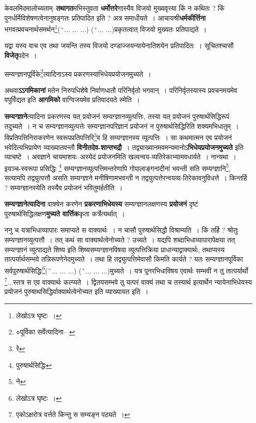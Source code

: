 \documentclass[article,12pt,a4paper]{memoir}
\newcommand{\add}[1]{($^{+}$#1)}
\begin{document}
	  \pstart केवलमिदमालोच्यताम्--\textbf{तथागत}मभिस्तुवता \textbf{धर्मोत्तरे}णास्यैव विजयो मुख्यवृत्त्या किं न कथितः ? किं पुनर्धर्मिविशेषणत्वेनानुषङ्गतः प्रतिपादित इति ? अत्र समाधीयते । आचायश्री\textbf{धर्मकीर्त्तिना} भगवत्प्रवचनार्थसमर्थन\footnote{लेखोऽत्र घृष्टः ।}\add{... ... ...} \add{... ...}प्रकृतत्वात् विजयो मुख्यतः प्रतिपाद्यते ।
	\pend
      

	  \pstart यद्वा यस्य वाच एव तथा जयन्ति तस्य विजयो दण्डाज्जयन्यायेनातिशयेन प्रतिपादितः । सूचितश्चासौ \textbf{विजेतृ}पदेन ।
	\pend
	  \bigskip
	  \begingroup
	

	  \pstart सम्यग्ज्ञानपूर्विके\footnote{०पूर्विका सर्वेत्यादिना--\cite{dp-msA} \cite{dp-edP} \cite{dp-edE}}\-त्यादिनाऽस्य प्रकरणस्याभिधेयप्रयोजनमुच्यते ।
	\pend
      
	  \endgroup
	

	  \pstart अथवा\textbf{ऽऽगमिकानां} मतेन निरुपधिशेषे निर्वाणधातौ परिनिर्वृतो भगवान् । परिनिर्वृतस्यास्य प्रवचनमयमेव वपुर्विद्यत इति \textbf{आगमिको} वाग्विजयमेव प्रतिपादयते स्मेति ।
	\pend
      

	  \pstart \textbf{सम्यग्ज्ञाने}त्यादिना प्रकरणस्य यत् प्रयोजनं सम्यग्ज्ञानव्युत्पत्तिः, तस्या यत् प्रयोजनं पुरुषार्थसिद्धिरूपं तदुच्यते । न च सम्यग्ज्ञानव्युत्पत्तेः सम्यग्ज्ञानपरिज्ञानं प्रयोजनं न पुरुषार्थसिद्धिरिति शक्यमभिधातुम् । विप्रतिपत्तिनिराकरणेन स्वरूपप्रतिपत्तिरि\footnote{रे}\-व हि सम्यग्ज्ञानस्य व्युत्पत्तिः । सा कथमात्मन एव प्रयोजनं भवेदित्यभिप्रायेण व्याख्यातवन्तौ \textbf{विनीतदेव-शान्तभद्रौ} । तद्व्याख्यानमवमन्यमानोऽ\textbf{भिधेयप्रयोजनमुच्यते} इति व्याचष्टे । अवज्ञाने चायमाशयः--अस्येदं प्रयोजनमिति खल्वन्वय-व्यतिरेकाभ्यामवधार्यते । नान्यथा । इयञ्च-स्वरूपा प्रसिद्धिः \footnote{पुरुषार्थसिद्धिः} सम्यग्ज्ञानव्युत्पत्तिमन्तरेणापि गोपालाङ्गनादीनां भवन्ती सति सम्यग्ज्ञानि\footnote{ने}\-, सत्यामपि तद्व्युत्पत्तौ असति सम्यग्ज्ञाने मनीषिणामभवन्ती न तद्व्युत्पत्तेरन्वयव्य-तिरेकावनुविधत्ते । किन्तर्हि ? सम्यग्ज्ञानस्येति तस्यैव प्रयोजनं भवितुमर्हतीति ।
	\pend
      

	  \pstart \textbf{सम्यग्ज्ञानेत्यादिना} वाक्येन करणेन \textbf{प्रकरणाभिधेयस्य} सम्यग्ज्ञानलक्षणस्य \textbf{प्रयोजनं} दृष्टं पुरुषार्थसिद्धिलक्षण\textbf{मुच्यते वार्त्तिक}कृता कर्त्रेत्यर्थात् ।
	\pend
      

	  \pstart ननु च यत्राभिधाव्यापारः समाप्यते स वाक्यार्थः । न चासौ पुरुषार्थसिद्धौ विश्राम्यति । किं तर्हि ? श्रोतुः सम्यग्ज्ञानव्युत्पत्तौ । तत् कथं सा वाक्यार्थत्वेनोच्यते ? उच्यते । यद्यपि शब्दाभिधाव्यापारापेक्षया तत् सम्यग्ज्ञानं व्युत्पाद्यते शिष्य इति शिष्यसम्यग्ज्ञानविषया व्युत्पत्तिक्रिया प्राधान्याद्वाक्यार्थः, तथाप्यस्य तात्पर्यार्थसम्भवे तन्निरूपणेनेदमुच्यते । तथा हि तद्व्युत्पत्तिमेवासौ किमति कार्यते ? यतः सम्यग्ज्ञानपूर्विका सर्वपुरुषार्थसिद्धिः\footnote{लेखोऽत्र घृष्टः ।}\add{... ... ...} \add{... ... ...}मुच्यते । यत्र पुनरभिधाविषय एवार्थः सम्भवी न तु तात्पर्यार्थो \leavevmode{}\footnote{एकोऽक्षरोत्र वर्त्तते किन्तु स सम्यङ्न पठ्यते ।}\-...स्तत्र स एव वाक्यार्थः कल्प्यते । द्वितयसम्भवे तु यत्परं वाक्यं तथा च तस्यार्थ इत्यार्थेन न्यायेनाभिधेयस्य प्रयोजनं पुरुषाथसिद्धिर्वाक्यार्थत्वेनोच्यत इति व्याख्यायत इति ।
	\pend
      
\end{document}
